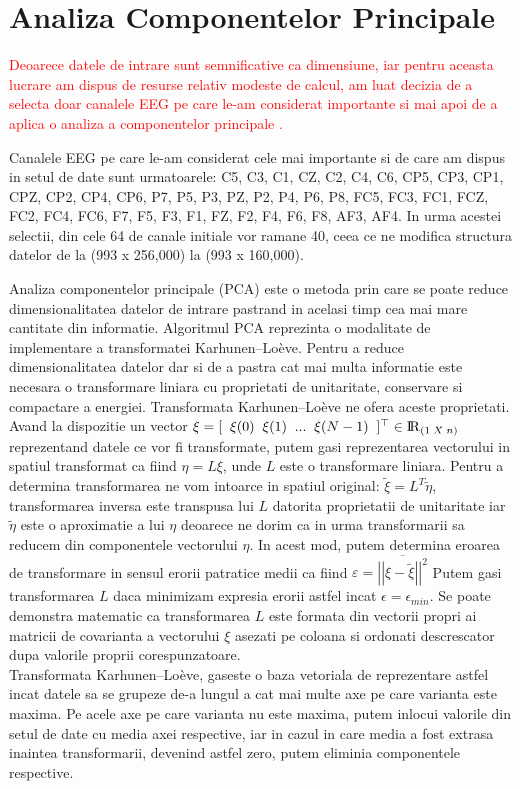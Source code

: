 \section{Analiza Componentelor Principale}

\quad \textcolor{red}{	
Deoarece datele de intrare sunt semnificative ca dimensiune, iar pentru aceasta
lucrare am dispus de resurse relativ modeste de calcul, am luat decizia de a 
selecta doar canalele EEG pe care le-am considerat importante si mai apoi
de a aplica o analiza a componentelor principale . }

Canalele EEG pe care le-am considerat cele mai importante si de care am dispus in 
setul de date sunt urmatoarele: C5, C3, C1, CZ, C2, C4, C6, CP5, CP3, CP1, CPZ,
CP2, CP4, CP6, P7, P5, P3, PZ, P2, P4, P6, P8, FC5, FC3, FC1, FCZ, FC2, FC4, FC6,
F7, F5, F3, F1, FZ, F2, F4, F6, F8, AF3, AF4.
In urma acestei selectii, din cele 64 de canale initiale vor ramane 40, ceea ce 
ne modifica structura datelor de la (993 x 256,000) la (993 x 160,000).

Analiza componentelor principale (PCA) este o metoda prin care se poate reduce
dimensionalitatea datelor de intrare pastrand in acelasi timp cea mai mare
cantitate din informatie. Algoritmul PCA reprezinta o modalitate
de implementare a transformatei Karhunen–Loève. Pentru a reduce dimensionalitatea
datelor dar si de a pastra cat mai multa informatie este necesara o transformare
liniara cu proprietati de unitaritate, conservare si compactare a energiei.
Transformata Karhunen–Loève ne ofera aceste proprietati. Avand la dispozitie
un vector $ \xi = [ \;\; \xi(0) \;\; \xi(1) \;\; ... \;\; \xi(N-1) \;\; ] ^\top \in 
{\rm I\!R}_{(1 \;X \;n)} $
reprezentand datele ce vor fi transformate, putem gasi reprezentarea vectorului in
spatiul transformat ca fiind $ \eta=L\xi $, unde $ L $ este o transformare liniara.
Pentru a determina transformarea ne vom intoarce in spatiul original: $ \tilde{\xi} = L^T \tilde{\eta} $, transformarea inversa este transpusa lui $ L $ datorita proprietatii
de unitaritate iar $ \tilde{\eta} $ este o aproximatie a lui $ \eta $ deoarece ne 
dorim ca in urma transformarii sa reducem din componentele vectorului $ \eta $.
In acest mod, putem determina eroarea de transformare in sensul erorii patratice medii
ca fiind $ \varepsilon = \overline{\left| \left| \xi - \widetilde{\xi} \right| \right| ^ 2} $
Putem gasi transformarea $ L $ daca minimizam expresia erorii astfel incat
$ \epsilon = \epsilon_{min} $. Se poate demonstra matematic ca transformarea $ L $
este formata din vectorii propri ai matricii de covarianta a vectorului $ \xi $
asezati pe coloana si ordonati descrescator dupa valorile proprii corespunzatoare.
\\
Transformata Karhunen–Loève, gaseste o baza vetoriala de reprezentare astfel incat 
datele sa se grupeze de-a lungul a cat mai multe axe pe care varianta este maxima.
Pe acele axe pe care varianta nu este maxima, putem inlocui valorile din setul de 
date cu media axei respective, iar in cazul in care media a fost extrasa inaintea
transformarii, devenind astfel zero, putem eliminia componentele respective.

